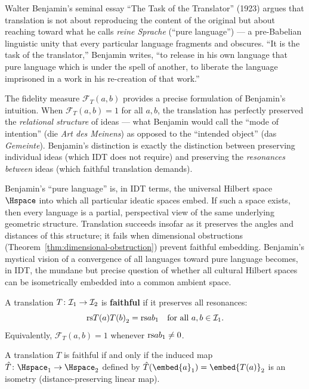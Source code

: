 \begin{interpretation}
\label{interp:ch18:benjamin_pure_language}
Walter Benjamin's seminal essay ``The Task of the Translator'' (1923)
argues that translation is not about reproducing the content of the
original but about reaching toward what he calls \emph{reine Sprache}
(``pure language'') --- a pre-Babelian linguistic unity that every
particular language fragments and obscures.  ``It is the task of the
translator,'' Benjamin writes, ``to release in his own language that
pure language which is under the spell of another, to liberate the
language imprisoned in a work in his re-creation of that work.''

The fidelity measure $\mathcal{F}_T(a,b)$ provides a precise formulation
of Benjamin's intuition.  When $\mathcal{F}_T(a,b) = 1$ for all $a, b$,
the translation has perfectly preserved the \emph{relational structure}
of ideas --- what Benjamin would call the ``mode of intention'' (die
\textit{Art des Meinens}) as opposed to the ``intended object'' (das
\textit{Gemeinte}).  Benjamin's distinction is exactly the distinction
between preserving individual ideas (which IDT does not require) and
preserving the \emph{resonances between} ideas (which faithful translation
demands).

Benjamin's ``pure language'' is, in IDT terms, the universal Hilbert space
$\Hspace$ into which all particular ideatic spaces embed.  If such a space
exists, then every language is a partial, perspectival view of the same
underlying geometric structure.  Translation succeeds insofar as it
preserves the angles and distances of this structure; it fails when
dimensional obstructions (Theorem~\ref{thm:dimensional-obstruction}) prevent
faithful embedding.  Benjamin's mystical vision of a convergence of all
languages toward pure language becomes, in IDT, the mundane but precise
question of whether all cultural Hilbert spaces can be isometrically embedded
into a common ambient space.
\end{interpretation}

\begin{definition}
\label{def:faithful}
A translation $T\colon \mathcal{I}_1 \to \mathcal{I}_2$ is \textbf{faithful} if it preserves
all resonances:
\[
  \mathrm{rs}{T(a)}{T(b)}_2 = \mathrm{rs}{a}{b}_1 \quad \text{for all } a, b \in \mathcal{I}_1.
\]
Equivalently, $\mathcal{F}_T(a, b) = 1$ whenever $\mathrm{rs}{a}{b}_1 \neq 0$.
\end{definition}

\begin{theorem}
\label{thm:faithful-isometry}
A translation $T$ is faithful if and only if the induced map
$\hat{T}\colon \Hspace_1 \to \Hspace_2$ defined by $\hat{T}(\embed{a}_1) =
\embed{T(a)}_2$ is an isometry (distance-preserving linear map).
\end{theorem}

